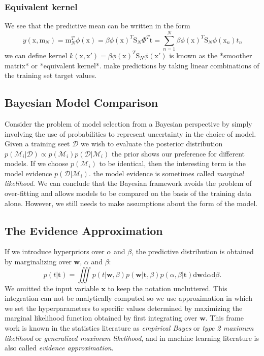 \documentclass[a4paper]{book}
\newcommand{\mrm}{\mathrm}
\newcommand{\mbf}{\mathbf}
\newcommand{\ww}{\mbf w}
\newcommand{\ttt}{\mbf t}
\newcommand{\xx}{\mbf x}
\begin{document}
\subsubsection{Equivalent kernel }
We see that the predictive mean can be written in the form
$$y(\mathrm x,\mathrm m_N) =\mathrm m_N^T\phi(\mathrm x)=\beta\phi(\mathrm x)^T\mathrm S_N\Phi^T\mathrm t=\sum_{n=1}^N\beta\phi(\mathrm x)^T\mathrm S_N\phi(\mathrm x_n)t_n$$
we can define kernel
$k(\mathrm x,\mathrm x') = \beta\phi(\mathrm x)^T\mathrm S_N\phi(\mathrm x')$ is known as the *smoother matrix* or *equivalent kernel*. make predictions by taking linear combinations of the training set target values.
\subsection{Bayesian Model Comparison}
Consider the problem of model selection from a Bayesian perspective by simply involving the use of probabilities to represent uncertainty in the choice of model.\newline
Given a training seet $\mathcal D$ we wish to evaluate the posterior distribution $p(\mathcal M_i|\mathcal D) \propto p(\mathcal M_i)p(\mathcal D|\mathcal M_i)$\newline
the prior shows our preference for different models.\newline
If we choose $p(\mathcal M_i)$ to be identical, then the interesting term is the model evidence $p(\mathcal D|\mathcal M_i)$.\newline
the model evidence is sometimes called \textit{marginal likelihood.}
We can conclude that the Bayesian framework avoids the problem of over-fitting  and allows models to be compared on the basis of the training data alone. However, we still needs to make assumptions about the form of the model.
\subsection{The Evidence Approximation}
If we introduce hyperpriors over $\alpha$ and $\beta$, the predictive distribution is obtained by marginalizing over $\ww$, $\alpha$ and $\beta$:
\begin{equation}\label{}
  p(t|\ttt)=\iiint p(t|\ww,\beta)p(\ww|\ttt,\beta)p(\alpha,\beta|\ttt)\mrm d\ww\mrm d\alpha\mrm d\beta.
\end{equation}
We omitted the input variable $\xx$ to keep the notation uncluttered. This integration can not be analytically computed so we use approximation in which we set the hyperparameters to specific values determined by maximizing the marginal likelihood function obtained by first integrating over $\ww$. This frame work is known in the statistics literature as \textit{empirical Bayes} or \textit{type 2 maximum likelihood} or \textit{generalized maximum likelihood}, and in machine learning literature is also called \textit{evidence approximation}.
\end{document}
